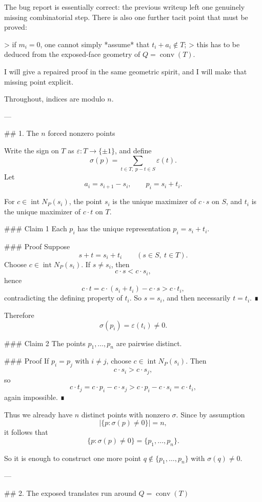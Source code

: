 The bug report is essentially correct: the previous writeup left one genuinely missing combinatorial step. There is also one further tacit point that must be proved:

> if \(m_i=0\), one cannot simply *assume* that \(t_i+a_i\notin T\);
> this has to be deduced from the exposed-face geometry of \(Q=\operatorname{conv}(T)\).

I will give a repaired proof in the same geometric spirit, and I will make that missing point explicit.

Throughout, indices are modulo \(n\).

---

## 1. The \(n\) forced nonzero points

Write the sign on \(T\) as \(\varepsilon:T\to\{\pm1\}\), and define
\[
\sigma(p)=\sum_{t\in T,\;p-t\in S}\varepsilon(t).
\]
Let
\[
a_i=s_{i+1}-s_i,\qquad p_i=s_i+t_i.
\]

For \(c\in \operatorname{int}N_P(s_i)\), the point \(s_i\) is the unique maximizer of \(c\cdot s\) on \(S\), and \(t_i\) is the unique maximizer of \(c\cdot t\) on \(T\).

### Claim 1
Each \(p_i\) has the unique representation \(p_i=s_i+t_i\).

### Proof
Suppose
\[
s+t=s_i+t_i
\qquad (s\in S,\ t\in T).
\]
Choose \(c\in \operatorname{int}N_P(s_i)\). If \(s\neq s_i\), then
\[
c\cdot s<c\cdot s_i,
\]
hence
\[
c\cdot t=c\cdot(s_i+t_i)-c\cdot s>c\cdot t_i,
\]
contradicting the defining property of \(t_i\). So \(s=s_i\), and then necessarily \(t=t_i\). ∎

Therefore
\[
\sigma(p_i)=\varepsilon(t_i)\neq0.
\]

### Claim 2
The points \(p_1,\dots,p_n\) are pairwise distinct.

### Proof
If \(p_i=p_j\) with \(i\neq j\), choose \(c\in \operatorname{int}N_P(s_i)\). Then
\[
c\cdot s_i>c\cdot s_j,
\]
so
\[
c\cdot t_j=c\cdot p_i-c\cdot s_j>c\cdot p_i-c\cdot s_i=c\cdot t_i,
\]
again impossible. ∎

Thus we already have \(n\) distinct points with nonzero \(\sigma\). Since by assumption
\[
\bigl|\{p:\sigma(p)\neq0\}\bigr|=n,
\]
it follows that
\[
\{p:\sigma(p)\neq0\}=\{p_1,\dots,p_n\}.
\]

So it is enough to construct one more point \(q\notin\{p_1,\dots,p_n\}\) with \(\sigma(q)\neq0\).

---

## 2. The exposed translates run around \(Q=\operatorname{conv}(T)\)

